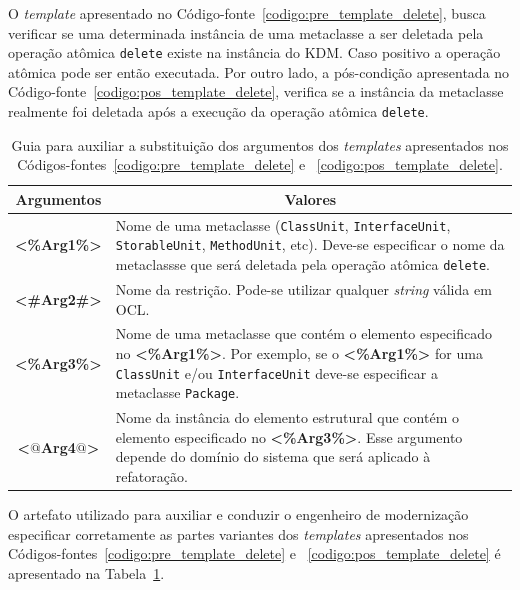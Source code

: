 O \textit{template} apresentado no Código-fonte~\ref{codigo:pre_template_delete}, busca verificar se uma determinada instância de uma metaclasse a ser deletada pela operação atômica \texttt{delete} existe na instância do KDM. Caso positivo a operação atômica pode ser então executada. Por outro lado, a pós-condição apresentada no Código-fonte~\ref{codigo:pos_template_delete}, verifica se a instância da metaclasse realmente foi deletada após a execução da operação atômica \texttt{delete}. 

\begin{table}[h]
\centering
\caption{Guia para auxiliar a substituição dos argumentos dos \textit{templates} apresentados nos Códigos-fontes~\ref{codigo:pre_template_delete} e ~\ref{codigo:pos_template_delete}.}
\label{tab:guia_template_pre_pos_delete}
\begin{tabular}{ | m{1.7cm} | m{12cm}| } 
\hline
\multicolumn{1}{|c|}{Argumentos}                                         & \multicolumn{1}{c|}{Valores} \\ \hline
\multicolumn{1}{|c|}{\textbf{<\%Arg1\%>}} & Nome de uma metaclasse (\texttt{ClassUnit}, \texttt{InterfaceUnit}, \texttt{StorableUnit}, \texttt{MethodUnit}, etc). Deve-se especificar o nome da metaclassse que será deletada pela operação atômica \texttt{delete}. \\ 
\hline
\multicolumn{1}{|c|}{\textbf{<\#Arg2\#>}} & Nome da restrição. Pode-se utilizar qualquer \textit{string} válida em OCL. \\ 
\hline
\multicolumn{1}{|c|}{\textbf{<\%Arg3\%>}} & Nome de uma metaclasse que contém o elemento especificado no \textbf{<\%Arg1\%>}. Por exemplo, se o \textbf{<\%Arg1\%>} for uma \texttt{ClassUnit} e/ou \texttt{InterfaceUnit} deve-se especificar a metaclasse \texttt{Package}. \\ 
\hline
\multicolumn{1}{|c|}{\textbf{<$@$Arg4$@$>}} & Nome da instância do elemento estrutural que contém o elemento especificado no \textbf{<\%Arg3\%>}. Esse argumento depende do domínio do sistema que será aplicado à refatoração. \\ 
\hline
\end{tabular}
\end{table}

O artefato utilizado para auxiliar e conduzir o engenheiro de modernização especificar corretamente as partes variantes dos \textit{templates} apresentados nos Códigos-fontes~\ref{codigo:pre_template_delete} e ~\ref{codigo:pos_template_delete} é apresentado na Tabela~\ref{tab:guia_template_pre_pos_delete}. 

